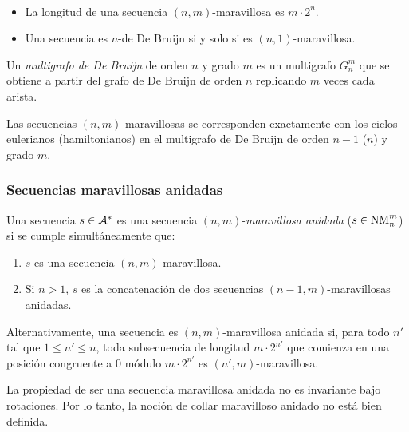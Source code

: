 \begin{obs}\ %
  \begin{itemize}
    \item La longitud de una secuencia $(n,m)$-maravillosa es $m \cdot 2^n$.
    \item Una secuencia es $n$-de De Bruijn si y solo si es
          $(n,1)$-maravillosa.
  \end{itemize}
\end{obs}

\begin{defi}
  Un \emph{multigrafo de De Bruijn} de orden $n$ y grado $m$ es un multigrafo
  $G_n^m$ que se obtiene a partir del grafo de De Bruijn de orden $n$
  replicando $m$ veces cada arista.
\end{defi}

\begin{obs}
  Las secuencias $(n,m)$-maravillosas se corresponden exactamente con los
  ciclos eulerianos (hamiltonianos) en el multigrafo de De Bruijn de orden $n -
    1$ ($n$) y grado $m$.
\end{obs}

\subsubsection{Secuencias maravillosas anidadas}

\begin{defi}
  Una secuencia $s \in \mathcal{A}^*$ es una secuencia $(n,m)$-\emph{maravillosa
    anidada} ($s \in \text{NM}_{n}^{m}$) si se cumple simultáneamente que:
  \begin{enumerate}
    \item $s$ es una secuencia $(n,m)$-maravillosa.
    \item Si $n > 1$, $s$ es la concatenación de dos secuencias
          $(n-1,m)$-maravillosas anidadas.
  \end{enumerate}

  Alternativamente, una secuencia es $(n,m)$-maravillosa anidada si, para todo
  $n'$ tal que $1 \leq n' \leq n$, toda subsecuencia de longitud
  $m \cdot 2^{n'}$ que comienza en una posición congruente a $0$ módulo
  $m \cdot 2^{n'}$ es $(n',m)$-maravillosa.
\end{defi}

\begin{obs}
  La propiedad de ser una secuencia maravillosa anidada no es invariante bajo
  rotaciones. Por lo tanto, la noción de collar maravilloso anidado no está
  bien definida.
\end{obs}


